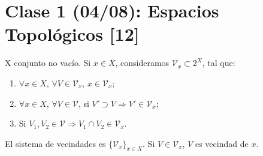 
	\section{Clase 1 (04/08): Espacios Topológicos [12]}

	\begin{definition}
		X conjunto no vacío. Si $x\in X$, consideramos $\mathcal{V}_x \subset 2^{X}$, tal que:

		\begin{enumerate}
			\item $\forall x \in X$, $\forall V \in \mathcal{V}_x$, $x \in \mathcal{V}_x$;

			\item $\forall x \in X$, $\forall V \in \mathcal{V}$, si $V' \supset V \Rightarrow V' \in \mathcal{V}_x$;

			\item Si $V_1,V_2 \in \mathcal{V} \Rightarrow V_1 \cap V_2 \in \mathcal{V}_x$.
		\end{enumerate}

		\noindent El sistema de vecindades es $\{ \mathcal{V}_x \}_{x \in X}$. Si $V \in \mathcal{V}_x$, $V$ es vecindad de $x$.  
	\end{definition}

